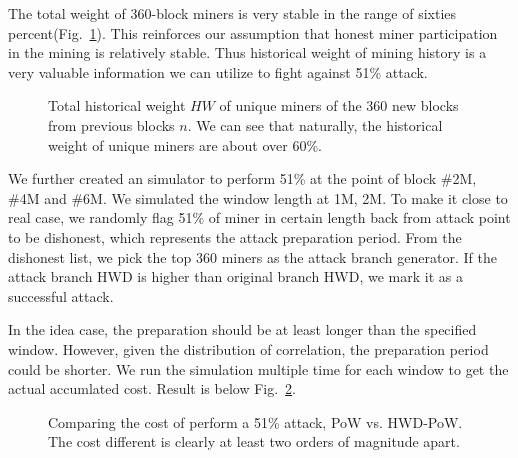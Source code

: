 \documentclass[conference]{IEEEtran}
\begin{document}
The total weight of 360-block miners is very stable in the range of sixties percent(Fig.~\ref{fig2}). This reinforces our assumption that honest miner participation in the mining is relatively stable. Thus historical weight of mining history is a very valuable information we can utilize to fight against 51\% attack.  

\begin{figure}[htbp]
    \caption{Total historical weight $H\!W$ of unique miners of the 360 new blocks from previous blocks $n$. We can see that naturally, the historical weight of unique miners are about over 60\%.}
    \label{fig2}
    \end{figure}    
    
We further created an simulator to perform 51\% at the point of block \#2M, \#4M and \#6M. We simulated the window length at 1M, 2M. To make it close to real case, we randomly flag 51\% of miner in certain length back from attack point to be dishonest, which represents the attack preparation period. From the dishonest list, we pick the top 360 miners as the attack branch generator. If the attack branch HWD is higher than original branch HWD, we mark it as a successful attack. 

In the idea case, the preparation should be at least longer than the specified window. However, given the distribution of correlation, the preparation period could be shorter. We run the simulation multiple time for each window to get the actual accumlated cost. Result is below Fig.~\ref{fig3}.

\begin{figure}[htbp]
\caption{Comparing the cost of perform a 51\% attack, PoW vs. HWD-PoW. The cost different is clearly at least two orders of magnitude apart.}
\label{fig3}
\end{figure}    
\end{document}
